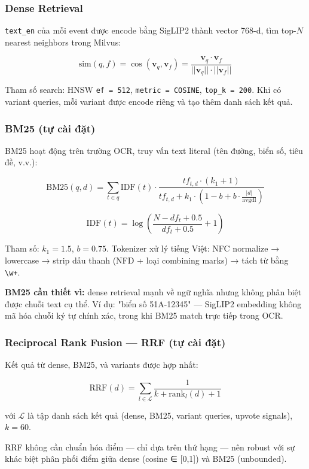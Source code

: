 \documentclass[12pt,a4paper,onecolumn]{article}
\begin{document}
\subsubsection{Dense Retrieval}

\texttt{text\_en} của mỗi event được encode bằng SigLIP2 thành vector 768-d, tìm top-$N$ nearest neighbors trong Milvus:

$$\text{sim}(q, f) = \cos(\mathbf{v}_q, \mathbf{v}_f) = \frac{\mathbf{v}_q \cdot \mathbf{v}_f}{||\mathbf{v}_q|| \cdot ||\mathbf{v}_f||}$$

Tham số search: HNSW \texttt{ef = 512}, \texttt{metric = COSINE}, \texttt{top\_k = 200}. Khi có variant queries, mỗi variant được encode riêng và tạo thêm danh sách kết quả.

\subsubsection{BM25 (tự cài đặt)}

BM25 hoạt động trên trường OCR, truy vấn text literal (tên đường, biển số, tiêu đề, v.v.):

$$\text{BM25}(q, d) = \sum_{t \in q} \text{IDF}(t) \cdot \frac{tf_{t,d} \cdot (k_1 + 1)}{tf_{t,d} + k_1 \cdot (1 - b + b \cdot \frac{|d|}{\text{avgdl}})}$$

$$\text{IDF}(t) = \log\left(\frac{N - df_t + 0.5}{df_t + 0.5} + 1\right)$$

Tham số: $k_1 = 1.5$, $b = 0.75$. Tokenizer xử lý tiếng Việt: NFC normalize → lowercase → strip dấu thanh (NFD + loại combining marks) → tách từ bằng \texttt{\textbackslash{}w+}.

\textbf{BM25 cần thiết vì:} dense retrieval mạnh về ngữ nghĩa nhưng không phân biệt được chuỗi text cụ thể. Ví dụ: "biển số 51A-12345" — SigLIP2 embedding không mã hóa chuỗi ký tự chính xác, trong khi BM25 match trực tiếp trong OCR.

\subsubsection{Reciprocal Rank Fusion — RRF (tự cài đặt)}

Kết quả từ dense, BM25, và variants được hợp nhất:

$$\text{RRF}(d) = \sum_{l \in \mathcal{L}} \frac{1}{k + \text{rank}_l(d) + 1}$$

với $\mathcal{L}$ là tập danh sách kết quả (dense, BM25, variant queries, upvote signals), $k = 60$.

RRF không cần chuẩn hóa điểm — chỉ dựa trên thứ hạng — nên robust với sự khác biệt phân phối điểm giữa dense (cosine ∈ [0,1]) và BM25 (unbounded).
\end{document}
